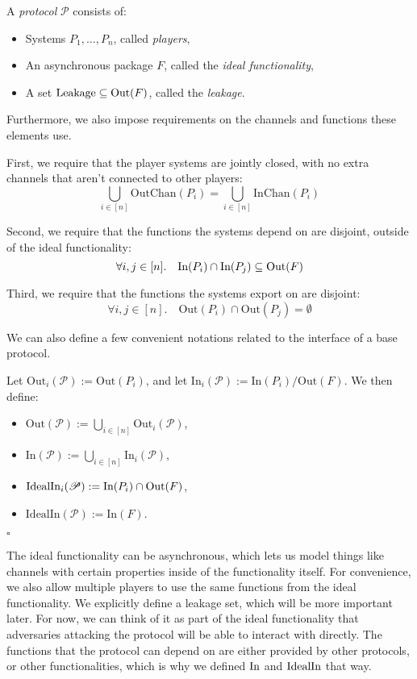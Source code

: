 \begin{definition}[Protocols]
A \emph{protocol} $\mathscr{P}$ consists of:
\begin{itemize}
\item Systems $P_1, \ldots, P_n$, called \emph{players},
\item An asynchronous package $F$, called the \emph{ideal functionality},
\item A set $\text{Leakage} \subseteq \text{Out}(F)$, called the \emph{leakage}.
\end{itemize}

Furthermore, we also impose requirements on the channels and functions
these elements use.

First, we require that the player systems are jointly closed,
with no extra channels that aren't connected to other players:
$$
\bigcup_{i \in [n]} \text{OutChan}(P_i) = \bigcup_{i \in [n]} \text{InChan}(P_i)
$$

Second, we require that the functions the systems depend on are disjoint,
outside of the ideal functionality:
$$
\forall i, j \in [n].\quad \text{In}(P_i) \cap \text{In}(P_j) \subseteq \text{Out}(F)
$$

Third, we require that the functions the systems export on are disjoint:
$$
\forall i, j \in [n].\quad \text{Out}(P_i) \cap \text{Out}(P_j) = \emptyset
$$

We can also define a few convenient notations related to the interface of a base
protocol.

Let $\text{Out}_i(\mathscr{P}) := \text{Out}(P_i)$, and let $\text{In}_i(\mathscr{P}) := \text{In}(P_i) / \text{Out}(F)$.
We then define:
\begin{itemize}
  \item $\text{Out}(\mathscr{P}) := \bigcup_{i \in [n]} \text{Out}_i(\mathscr{P})$,
  \item $\text{In}(\mathscr{P}) := \bigcup_{i \in [n]} \text{In}_i(\mathscr{P})$,
  \item $\text{IdealIn}_i(\mathscr{P}) := \text{In}(P_i) \cap \text{Out}(F)$,
  \item $\text{IdealIn}(\mathscr{P}) := \text{In}(F)$.
\end{itemize}

$\square$
\end{definition}

The ideal functionality can be asynchronous, which lets
us model things like channels with certain properties
inside of the functionality itself.
For convenience, we also allow multiple players
to use the same functions from the ideal functionality.
We explicitly define a leakage set, which will be 
more important later.
For now, we can think of it as part of the ideal functionality
that adversaries attacking the protocol will be able to interact with
directly.
The functions that the protocol can depend on are either
provided by other protocols, or other functionalities,
which is why we defined $\text{In}$ and $\text{IdealIn}$ that way.

